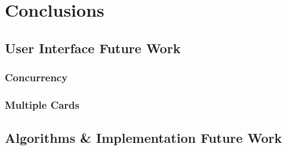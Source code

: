 \chapter{Conclusions}

\section{User Interface Future Work}\label{user-interface-future-work}

\subsection{Concurrency}\label{concurrency}

\subsection{Multiple Cards}\label{multiple-cards}

\section{Algorithms \& Implementation Future
Work}\label{algorithms-implementation-future-work}
